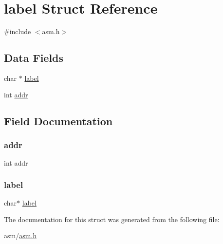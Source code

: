 \hypertarget{structlabel}{}\section{label Struct Reference}
\label{structlabel}


{\ttfamily \#include $<$asm.\+h$>$}

\subsection*{Data Fields}
\begin{DoxyCompactItemize}
\item 
char $\ast$ \hyperlink{structlabel_acf60de4c64d60c1b9449c056bc6bfcf7}{label}
\item 
int \hyperlink{structlabel_aafb8164f20f79a2dd0290502a25367d1}{addr}
\end{DoxyCompactItemize}


\subsection{Field Documentation}
\mbox{\label{structlabel_aafb8164f20f79a2dd0290502a25367d1}} 
\subsubsection{\texorpdfstring{addr}{addr}}
{\footnotesize\ttfamily int addr}

\mbox{\label{structlabel_acf60de4c64d60c1b9449c056bc6bfcf7}} 
\subsubsection{\texorpdfstring{label}{label}}
{\footnotesize\ttfamily char$\ast$ \hyperlink{structlabel}{label}}



The documentation for this struct was generated from the following file\+:\begin{DoxyCompactItemize}
\item 
asm/\hyperlink{asm_8h}{asm.\+h}\end{DoxyCompactItemize}
